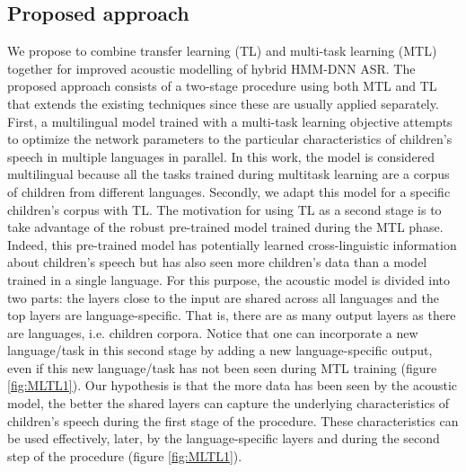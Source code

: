 \subsection{Proposed approach}
\label{section:method}
We propose to combine transfer learning (TL) and multi-task learning (MTL) together for improved acoustic modelling of hybrid HMM-DNN ASR.
The proposed approach consists of a two-stage procedure using both MTL and TL that extends the existing techniques since these are usually applied separately.
First, a multilingual model trained with a multi-task learning objective attempts to optimize the network parameters to the particular characteristics of children's speech in multiple languages in parallel. In this work, the model is considered multilingual because all the tasks trained during multitask learning are a corpus of children from different languages.
Secondly, we adapt this model for a specific children's corpus with TL. The motivation for using TL as a second stage is to take advantage of the robust pre-trained model trained during the MTL phase. Indeed, this pre-trained model has potentially learned cross-linguistic information about children's speech but has also seen more children's data than a model trained in a single language. 
For this purpose, the acoustic model is divided into two parts: the layers close to the input are shared across all languages and the top layers are language-specific. That is, there are as many output layers as there are languages, i.e. children corpora. Notice that one can incorporate a new language/task in this second stage by adding a new language-specific output,  even if this new language/task has not been seen during  MTL training (figure \ref{fig:MLTL1}).
Our hypothesis is that the more data has been seen by the acoustic model, the better the shared layers can capture the underlying characteristics of children's speech during the first stage of the procedure. These characteristics can be used effectively, later,  by the language-specific layers and during the second step of the procedure (figure \ref{fig:MLTL1}). 

